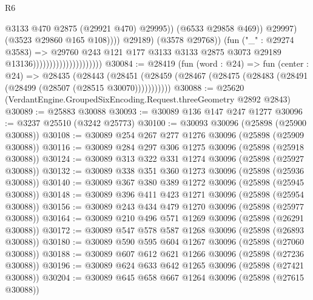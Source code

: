 \begin{lexlean}{R6}
\begin{coremodule}
                                                              @3133
                                                              @470
                                                              @2875
                                                              (@29921 @470)
                                                              @29995))
                                                          (@6533 @29858 @469))
                                                        @29997)
                                                      (@3523 @29860 @165 @108))))
                                                @29189)
                                              (@3578 @29768))
                                            (fun ("_" : @29274 @3583) =>
                                            @29760
                                              @243
                                              @121
                                              @177
                                              @3133
                                              @3133
                                              @2875
                                              @3073
                                              @29189
                                              @13136)))))))))))))))))))))
@30084 := @28419
    (fun (word : @24) =>
    fun (center : @24) =>
    @28435
      (@28443
        (@28451 (@28459 (@28467 (@28475 (@28483 (@28491 (@28499 (@28507 (@28515 @30070)))))))))))
@30088 := @25620 (VerdantEngine.GroupedSixEncoding.Request.threeGeometry @2892 @2843)
@30089 := @25883 @30088
@30093 := @30089 @136 @147 @247 @1277
@30096 := @3237 @25510 (@3242 @25773)
@30100 := @30093 @30096 (@25898 (@25900 @30088))
@30108 := @30089 @254 @267 @277 @1276 @30096 (@25898 (@25909 @30088))
@30116 := @30089 @284 @297 @306 @1275 @30096 (@25898 (@25918 @30088))
@30124 := @30089 @313 @322 @331 @1274 @30096 (@25898 (@25927 @30088))
@30132 := @30089 @338 @351 @360 @1273 @30096 (@25898 (@25936 @30088))
@30140 := @30089 @367 @380 @389 @1272 @30096 (@25898 (@25945 @30088))
@30148 := @30089 @396 @411 @423 @1271 @30096 (@25898 (@25954 @30088))
@30156 := @30089 @243 @434 @479 @1270 @30096 (@25898 (@25977 @30088))
@30164 := @30089 @210 @496 @571 @1269 @30096 (@25898 (@26291 @30088))
@30172 := @30089 @547 @578 @587 @1268 @30096 (@25898 (@26893 @30088))
@30180 := @30089 @590 @595 @604 @1267 @30096 (@25898 (@27060 @30088))
@30188 := @30089 @607 @612 @621 @1266 @30096 (@25898 (@27236 @30088))
@30196 := @30089 @624 @633 @642 @1265 @30096 (@25898 (@27421 @30088))
@30204 := @30089 @645 @658 @667 @1264 @30096 (@25898 (@27615 @30088))

\end{coremodule}
\end{lexlean}
